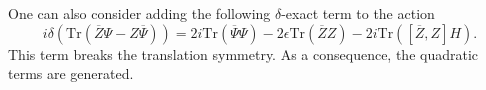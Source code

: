 One can also consider adding the following $\delta$-exact term to the action
\[
	i\delta \left(\mathrm{Tr}(\overline{Z}\Psi - Z \overline{\Psi})\right) = 2 i \mathrm{Tr}(\overline{\Psi}\Psi) -2\epsilon \mathrm{Tr}(\overline{Z}Z) - 2i \mathrm{Tr}([\overline{Z},Z]H) 
.\] 
This term breaks the translation symmetry.
As a consequence, the quadratic terms are generated.


